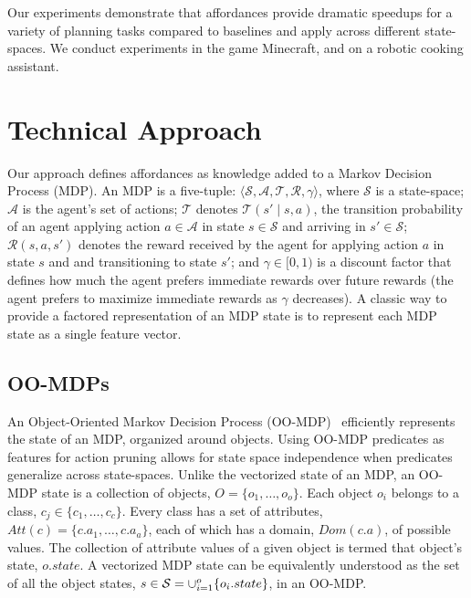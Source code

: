 \documentclass[conference]{IEEEtran}
\begin{document}

Our experiments demonstrate that affordances provide dramatic speedups for a variety
of planning tasks compared to baselines and apply across different state-spaces.  We 
conduct experiments in the game Minecraft, and on a robotic cooking assistant. 

\section{Technical Approach}
\label{sec:technical_approach}

Our approach defines affordances as knowledge added to a Markov
Decision Process (MDP).  An MDP is a five-tuple: $\langle \mathcal{S},
\mathcal{A}, \mathcal{T}, \mathcal{R}, \gamma \rangle$, where
$\mathcal{S}$ is a state-space; $\mathcal{A}$ is the agent's set of
actions; $\mathcal{T}$ denotes $\mathcal{T}(s' \mid s,a)$, the
transition probability of an agent applying action $a \in \mathcal{A}$
in state $s \in \mathcal{S}$ and arriving in $s' \in \mathcal{S}$;
$\mathcal{R}(s,a,s')$ denotes the reward received by the agent for
applying action $a$ in state $s$ and and transitioning to state $s'$;
and $\gamma \in [0, 1)$ is a discount factor that defines how much the
  agent prefers immediate rewards over future rewards (the agent
  prefers to maximize immediate rewards as $\gamma$ decreases). A
  classic way to provide a factored representation of an MDP state is
  to represent each MDP state as a single feature vector.

\subsection{OO-MDPs}
An Object-Oriented Markov Decision Process (OO-MDP)~\citep{diuk08}
efficiently represents the state of an MDP, organized around
objects. Using OO-MDP predicates as features for action pruning allows
for state space independence when predicates generalize across
state-spaces.  Unlike the vectorized state of an MDP, an OO-MDP state
is a collection of objects, $O = \{o_1, \ldots, o_o \}$.  Each object
$o_i$ belongs to a class, $c_j \in \{c_1, \ldots, c_c\}$. Every class
has a set of attributes, $Att(c) = \{c.a_1, \ldots, c.a_a \}$, each of
which has a domain, $Dom(c.a)$, of possible values. The collection of
attribute values of a given object is termed that object's state,
$o.state$. A vectorized MDP state can be equivalently understood as
the set of all the object states, $s \in {\cal S} = \cup_{i = 1}^o
\{o_i.state\}$, in an OO-MDP.
\end{document}
